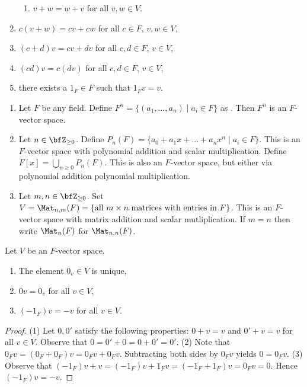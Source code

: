 \begin{definition}
\begin{enumerate}[label = (\arabic*)]
\begin{enumerate}[label = (\roman*)]
                        \item $v + w = w+ v$ for all $v,w \in V$. 
                    \end{enumerate}
                \item $c(v+w) = cv + cw$ for all $c \in F$, $v,w \in V$,
                \item $(c+d)v = cv + dv$ for all $c,d \in F$, $v \in V$,
                \item $(cd)v = c(dv)$ for all $c,d \in F$, $v \in V$,
                \item there exists a $1_F \in F$ such that $1_F v = v$.
            \end{enumerate}
    \end{definition}

    \begin{example}
        \phantom{a}
        \begin{enumerate}[label = (\arabic*)]
            \item Let $F$ be any field. Define $F^n = \{(a_1,...,a_n) \mid a_i \in F\}$ as . Then $F^n$ is an $F$-vector space.
            \item Let $n \in \bfZ_{\geq 0}$. Define $P_n(F) = \{a_0 + a_1 x + ... + a_n x^n \mid a_i \in F\}$. This is an $F$-vector space with polynomial addition and scalar multiplication. Define $F[x] = \bigcup_{n \geq 0} P_n(F)$. This is also an $F$-vector space, but either via polynomial addition  polynomial multiplication.
            \item Let $m,n \in \bfZ_{\geq 0}$. Set $V = \Mat_{n,m}{(F)} = \{\text{all $m \times n$ matrices with entries in $F$}\}$. This is an $F$-vector space with matrix addition and scalar mutliplication. If $m = n$ then write $\Mat_{n}{(F)}$ for $\Mat_{n,n}{(F)}$.
        \end{enumerate}
    \end{example}

    \begin{lemma}
        Let $V$ be an $F$-vector space.
        \begin{enumerate}
            \item The element $0_v \in V$ is unique,
            \item $0v = 0_v$ for all $v \in V$,
            \item $(-1_F)v = -v$ for all $v \in V$.
        \end{enumerate}
    \end{lemma}
        \begin{proof}
            (1) Let $0,0'$ satisfy the following properties: $0+v = v$ and $0' + v = v$ for all $v \in V$. Observe that $0 = 0' + 0 = 0 + 0' = 0'$. (2) Note that $0_F v = (0_F + 0_F)v = 0_F v + 0_F v$. Subtracting both sides by $0_F v$ yields $0 = 0_F v$. (3) Observe that $(-1_F)v + v = (-1_F)v + 1_F v = (-1_F + 1_F)v = 0_F v = 0$. Hence $(-1_F)v = -v$.
        \end{proof}
    
